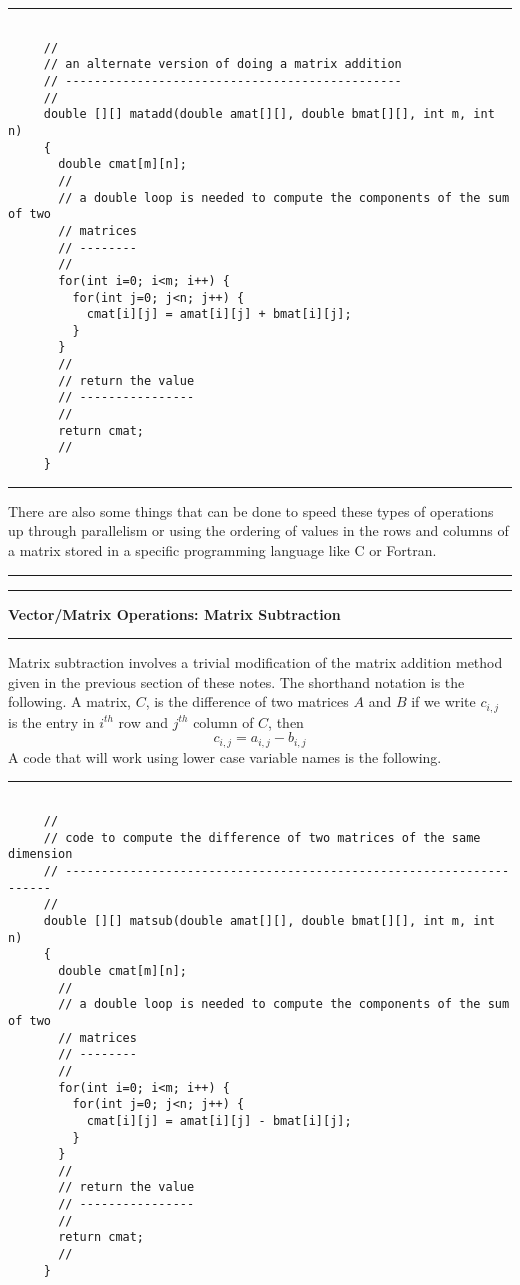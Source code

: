 \documentclass[10pt,fleqn]{article}
\begin{document}
\vskip0.1in\hrule\vskip0.1in
\begin{verbatim}

     //
     // an alternate version of doing a matrix addition
     // -----------------------------------------------
     //
     double [][] matadd(double amat[][], double bmat[][], int m, int n)
     {
       double cmat[m][n];
       //
       // a double loop is needed to compute the components of the sum of two
       // matrices
       // --------
       //
       for(int i=0; i<m; i++) {
         for(int j=0; j<n; j++) {
           cmat[i][j] = amat[i][j] + bmat[i][j];
         }
       }
       //
       // return the value
       // ----------------
       //
       return cmat;
       //
     }

\end{verbatim}
\vskip0.1in\hrule\vskip0.1in
\noindent
There are also some things that can be done to speed these types of operations
up through parallelism or using the ordering of values in the rows and columns
of a matrix stored in a specific programming language like C or Fortran. 
\vskip0.1in\hrule\vskip0.1in
\newpage
\vskip0.1in\hrule\vskip0.1in
\noindent
{\bf Vector/Matrix Operations: Matrix Subtraction}
\vskip0.1in\hrule\vskip0.1in
\noindent
Matrix subtraction involves a trivial modification of the matrix addition method
given in the previous section of these notes. The shorthand notation is the
following. A matrix, $C$, is the difference of two matrices $A$ and $B$ if we
write $c_{i,j}$ is the entry in $i^{th}$ row and $j^{th}$ column of $C$, then
$$
  c_{i,j} = a_{i,j} - b_{i,j}
$$
A code that will work using lower case variable names is the following.
\vskip0.1in\hrule\vskip0.1in
\begin{verbatim}

     //
     // code to compute the difference of two matrices of the same dimension
     // --------------------------------------------------------------------
     //
     double [][] matsub(double amat[][], double bmat[][], int m, int n)
     {
       double cmat[m][n];
       //
       // a double loop is needed to compute the components of the sum of two
       // matrices
       // --------
       //
       for(int i=0; i<m; i++) {
         for(int j=0; j<n; j++) {
           cmat[i][j] = amat[i][j] - bmat[i][j];
         }
       }
       //
       // return the value
       // ----------------
       //
       return cmat;
       //
     }

\end{verbatim}
\end{document}
